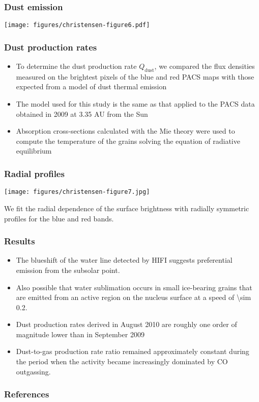 \documentclass{beamer}
\begin{document}
\begin{frame}
\frametitle{Dust emission}
\texttt{[image: figures/christensen-figure6.pdf]}
\end{frame}

\begin{frame}
\frametitle{Dust production rates}
\begin{itemize}
\item To determine the dust production rate $Q_\mathrm{dust}$, we
compared the flux densities measured on the brightest pixels of the blue
and red PACS maps with those expected from a model of dust thermal
emission
\item The model used for this study is the same as that applied to the PACS
data obtained in 2009 at 3.35 AU from the Sun
\citep{2010A&A...518L.149B}
\item Absorption cross-sections calculated with the
Mie theory were used to compute the temperature of the grains solving the
equation of radiative equilibrium
\end{itemize}
\end{frame}

\begin{frame}
\frametitle{Radial profiles}
\texttt{[image: figures/christensen-figure7.jpg]}

We fit the radial dependence of the surface brightness with radially
symmetric profiles for the blue and red bands.
\end{frame}

\begin{frame}
\frametitle{Results}
\begin{itemize}
  \item The blueshift of the water line detected by HIFI suggests
  preferential emission from the subsolar point.
  \item Also
  possible that water sublimation occurs in small ice-bearing grains
  that are emitted from an active region on the nucleus surface at a
  speed of \SI{\sim 0.2}{\kms}.
  \item Dust production rates derived in
  August 2010 are roughly one order of magnitude lower than in
  September 2009
  \item Dust-to-gas production rate
  ratio remained approximately constant during the period when the
  activity became increasingly dominated by CO outgassing.
\end{itemize}
\end{frame}

\begin{frame}
\frametitle{References}


\end{frame}
\end{document}
